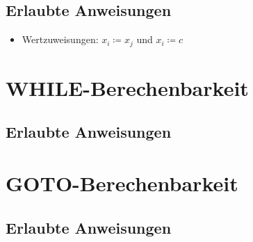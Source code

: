 \subsection{Erlaubte Anweisungen}
\begin{itemize}
	\item Wertzuweisungen: $x_i\coloneqq x_j$ und $x_i\coloneqq c$
\end{itemize}



\section{WHILE-Berechenbarkeit}\label{sec:while}
\subsection{Erlaubte Anweisungen}

\section{GOTO-Berechenbarkeit}\label{sec:while}
\subsection{Erlaubte Anweisungen}
